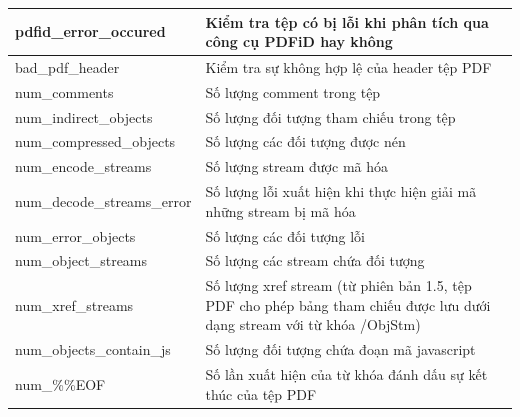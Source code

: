 \documentclass[./../main.tex]{subfiles}
\begin{document}
\begin{longtable}[c]{|p{}|p{}|}
	pdfid\_error\_occured                     & Kiểm tra tệp có bị lỗi khi phân tích qua công cụ PDFiD hay không                                                            \\ \hline
	bad\_pdf\_header                          & Kiểm tra sự không hợp lệ của header tệp PDF                                                                                 \\ \hline
	num\_comments                             & Số lượng comment trong tệp                                                                                                  \\ \hline
	num\_indirect\_objects                    & Số lượng đối tượng tham chiếu trong tệp                                                                                     \\ \hline
	num\_compressed\_objects                  & Số lượng các đối tượng được nén                                                                                             \\ \hline
	num\_encode\_streams                      & Số lượng stream được mã hóa                                                                                                 \\ \hline
	num\_decode\_streams\_error               & Số lượng lỗi xuất hiện khi thực hiện giải mã những stream bị mã hóa                                                         \\ \hline
	num\_error\_objects                       & Số lượng các đối tượng lỗi                                                                                                  \\ \hline
	num\_object\_streams                      & Số lượng các stream chứa đối tượng                                                                                          \\ \hline
	num\_xref\_streams                        & Số lượng xref stream (từ phiên bản 1.5, tệp PDF cho phép bảng tham chiếu được lưu dưới dạng stream với từ khóa /ObjStm)     \\ \hline
	num\_objects\_contain\_js                 & Số lượng đối tượng chứa đoạn mã javascript                                                                                  \\ \hline
	num\_\%\%EOF                              & Số lần xuất hiện của từ khóa đánh dấu sự kết thúc của tệp PDF                                                               \\ \hline

\end{longtable}
\end{document}

